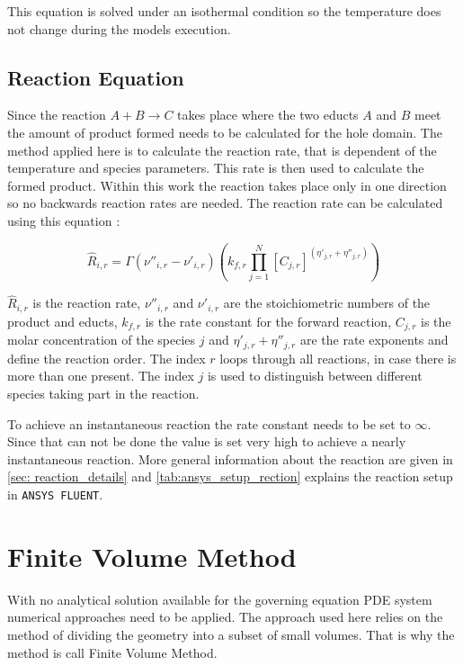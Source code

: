 \documentclass[../thesis.tex]{subfiles}
\begin{document}
This equation is solved under an isothermal condition so the temperature does not change during the models execution. 

\subsection{Reaction Equation}
\label{sec: reaction_eqn}

Since the reaction $ A + B \rightarrow C$ takes place where the two educts $A$ and $B$ meet the amount of product formed needs to be calculated for the hole domain. The method applied here is to calculate the reaction rate, that is dependent of the temperature and species parameters. This rate is then used to calculate the formed product. Within this work the reaction takes place only in one direction so no backwards reaction rates are needed. The reaction rate can be calculated using this equation \cite{manual2009ansys}:

\begin{equation}
\label{eqn:reaction}
\hat{R}_{i,r} = {\Gamma} \left(\nu''_{i,r} - \nu'_{i,r} \right) \left(k_{f,r} \prod_{j=1}^{N} \left[C_{j,r} \right]^{(\eta'_{j,r} + \eta''_{j,r})} \right) 
\end{equation}

$\hat{R}_{i,r}$ is the reaction rate, $\nu''_{i,r}$ and $\nu'_{i,r}$ are the stoichiometric numbers of the product and educts, $k_{f,r}$ is the rate constant for the forward reaction, $C_{j,r}$ is the molar concentration of the species $j$ and $\eta'_{j,r} + \eta''_{j,r}$ are the rate exponents and define the reaction order. 
The index $r$ loops through all reactions, in case there is more than one present. The index $j$ is used to distinguish between different species taking part in the reaction.

To achieve an instantaneous reaction the rate constant needs to be set to $\infty$. Since that can not be done the value is set very high to achieve a nearly instantaneous reaction. More general information about the reaction are given in \autoref{sec: reaction_details} and \autoref{tab:ansys_setup_rection} explains the reaction setup in \texttt{ANSYS FLUENT}. 

\section{Finite Volume Method}
With no analytical solution available for the governing equation PDE system numerical approaches need to be applied. The approach used here relies on the method of dividing the geometry into a subset of small volumes. That is why the method is call Finite Volume Method.
\end{document}
